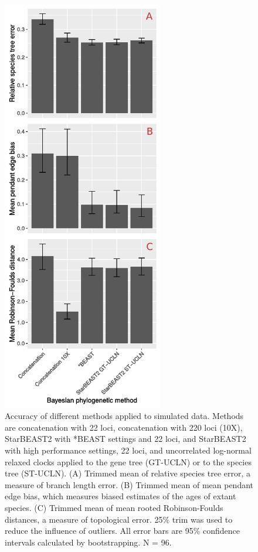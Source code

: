 \documentclass[nogrid]{MBE}%
\begin{document}
\begin{figure}[htb!]
\centering
\includegraphics[width=7cm]{tree_error.pdf}
\caption
{Accuracy of different methods applied to simulated data. Methods are concatenation with 22 loci, concatenation with 220 loci
(10X), StarBEAST2 with *BEAST settings and 22 loci, and StarBEAST2 with
high performance settings, 22 loci, and uncorrelated log-normal relaxed clocks applied
to the gene tree (GT-UCLN) or to the species tree (ST-UCLN). (A) Trimmed mean of
relative species tree error, a measure of branch length error. (B) Trimmed
mean of mean pendant edge bias, which measures biased estimates of the ages of
extant species. (C) Trimmed mean of mean rooted Robinson-Foulds distances, a
measure of topological error. 25\% trim was used to reduce the
influence of outliers. All error bars are 95\% confidence intervals calculated
by bootstrapping. N = 96.}
\label{fig:speciesTreeError}
\end{figure}
\end{document}

